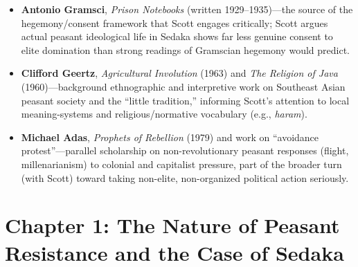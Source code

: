 \documentclass[12pt]{article}
\begin{document}
\begin{itemize}[leftmargin=*, itemsep=4pt]
    \item \textbf{Antonio Gramsci}, \textit{Prison Notebooks} (written 1929--1935)---the source of the hegemony/consent framework that Scott engages critically; Scott argues actual peasant ideological life in Sedaka shows far less genuine consent to elite domination than strong readings of Gramscian hegemony would predict.
    \item \textbf{Clifford Geertz}, \textit{Agricultural Involution} (1963) and \textit{The Religion of Java} (1960)---background ethnographic and interpretive work on Southeast Asian peasant society and the ``little tradition,'' informing Scott's attention to local meaning-systems and religious/normative vocabulary (e.g., \textit{haram}).
    \item \textbf{Michael Adas}, \textit{Prophets of Rebellion} (1979) and work on ``avoidance protest''---parallel scholarship on non-revolutionary peasant responses (flight, millenarianism) to colonial and capitalist pressure, part of the broader turn (with Scott) toward taking non-elite, non-organized political action seriously.
\end{itemize}

\section{Chapter 1: The Nature of Peasant Resistance and the Case of Sedaka}
\end{document}
